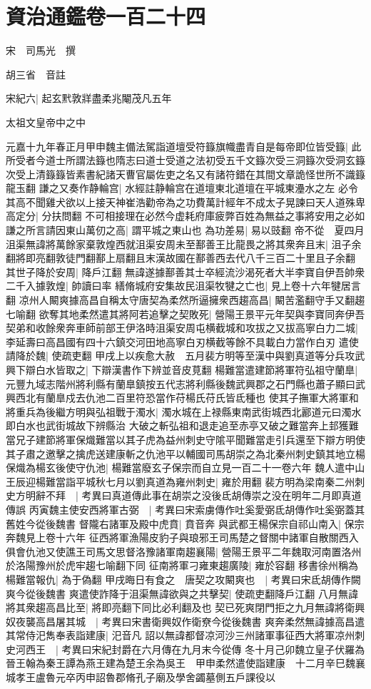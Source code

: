 \chapter{資治通鑑卷一百二十四}
宋　司馬光　撰

胡三省　音註

宋紀六|{
	起玄黓敦牂盡柔兆閹茂凡五年}


太祖文皇帝中之中

元嘉十九年春正月甲申魏主備法駕詣道壇受符籙旗幟盡青自是每帝即位皆受籙|{
	此所受者今道士所謂法籙也隋志曰道士受道之法初受五千文籙次受三洞籙次受洞玄籙次受上清籙籙皆素書紀諸天曹官屬佐吏之名又有諸符錯在其間文章詭怪世所不識籙龍玉翻}
謙之又奏作静輪宫|{
	水經註静輪宫在道壇東北道壇在平城東灅水之左}
必令其高不聞雞犬欲以上接天神崔浩勸帝為之功費萬計經年不成太子晃諫曰天人道殊卑高定分|{
	分扶問翻}
不可相接理在必然今虚耗府庫疲弊百姓為無益之事將安用之必如謙之所言請因東山萬仞之高|{
	謂平城之東山也}
為功差易|{
	易以豉翻}
帝不從　夏四月沮渠無諱將萬餘家棄敦煌西就沮渠安周未至鄯善王比龍畏之將其衆奔且末|{
	沮子余翻將即亮翻敦徒門翻鄯上扇翻且末漢故國在鄯善西去代八千三百二十里且子余翻}
其世子降於安周|{
	降戶江翻}
無諱遂據鄯善其士卒經流沙渴死者大半李寶自伊吾帥衆二千入據敦煌|{
	帥讀曰率}
繕脩城府安集故民沮渠牧犍之亡也|{
	見上卷十六年犍居言翻}
凉州人闞爽據高昌自稱太守唐契為柔然所逼擁衆西趨高昌|{
	闞苦濫翻守手又翻趨七喻翻}
欲奪其地柔然遣其將阿若追擊之契敗死|{
	營陽王景平元年契與李寶同奔伊吾}
契弟和收餘衆奔車師前部王伊洛時沮渠安周屯横截城和攻拔之又拔高寧白力二城|{
	李延壽曰高昌國有四十六鎮交河田地高寧白刃横截等餘不具載白力當作白刃}
遣使請降於魏|{
	使疏吏翻}
甲戌上以疾愈大赦　五月裴方明等至漢中與劉真道等分兵攻武興下辯白水皆取之|{
	下辯漢書作下辨並音皮莧翻}
楊難當遣建節將軍符弘祖守蘭臯|{
	元豐九域志階州將利縣有蘭臯鎮按五代志將利縣後魏武興郡之石門縣也蕭子顯曰武興西北有蘭臯戍去仇池二百里符恐當作苻楊氏苻氏皆氐種也}
使其子撫軍大將軍和將重兵為後繼方明與弘祖戰于濁水|{
	濁水城在上禄縣東南武街城西北酈道元曰濁水即白水也武街城故下辨縣治}
大破之斬弘祖和退走追至赤亭又破之難當奔上邽獲難當兄子建節將軍保熾難當以其子虎為益州刺史守隂平聞難當走引兵還至下辯方明使其子肅之邀擊之擒虎送建康斬之仇池平以輔國司馬胡崇之為北秦州刺史鎮其地立楊保熾為楊玄後使守仇池|{
	楊難當廢玄子保宗而自立見一百二十一卷六年}
魏人遣中山王辰迎楊難當詣平城秋七月以劉真道為雍州刺史|{
	雍於用翻}
裴方明為梁南秦二州刺史方明辭不拜　|{
	考異曰真道傳此事在胡崇之没後氐胡傳崇之没在明年二月即真道傳誤}
丙寅魏主使安西將軍古弼　|{
	考異曰宋索虜傳作吐奚愛弼氐胡傳作吐奚弼蓋其舊姓今從後魏書}
督隴右諸軍及殿中虎賁|{
	賁音奔}
與武都王楊保宗自祁山南入|{
	保宗奔魏見上卷十六年}
征西將軍漁陽皮豹子與琅邪王司馬楚之督關中諸軍自散關西入俱會仇池又使譙王司馬文思督洛豫諸軍南趨襄陽|{
	營陽王景平二年魏取河南置洛州於洛陽豫州於虎牢趨七喻翻下同}
征南將軍刁雍東趨廣陵|{
	雍於容翻}
移書徐州稱為楊難當報仇|{
	為于偽翻}
甲戌晦日有食之　唐契之攻闞爽也　|{
	考異曰宋氐胡傳作闕爽今從後魏書}
爽遣使詐降于沮渠無諱欲與之共擊契|{
	使疏吏翻降戶江翻}
八月無諱將其衆趨高昌比至|{
	將即亮翻下同比必利翻及也}
契已死爽閉門拒之九月無諱將衛興奴夜襲高昌屠其城　|{
	考異曰宋書衛興奴作衛尞今從後魏書}
爽奔柔然無諱據高昌遣其常侍汜雋奉表詣建康|{
	汜音凡}
詔以無諱都督凉河沙三州諸軍事征西大將軍凉州刺史河西王　|{
	考異曰宋紀封爵在六月傳在九月末今從傳}
冬十月己卯魏立皇子伏羅為晉王翰為秦王譚為燕王建為楚王余為吳王　甲申柔然遣使詣建康　十二月辛巳魏襄城孝王盧魯元卒丙申詔魯郡脩孔子廟及學舍蠲墓側五戶課役以


